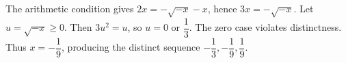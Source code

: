 The arithmetic condition gives $2x=-\sqrt{-x}-x$, hence $3x=-\sqrt{-x}$. Let $u=\sqrt{-x}\ge0$. Then $3u^2=u$, so $u=0$ or $\dfrac{1}{3}$. The zero case violates distinctness. Thus $\boxed{x=-\dfrac{1}{9}}$, producing the distinct sequence $-\dfrac{1}{3},-\dfrac{1}{9},\dfrac{1}{9}$.

